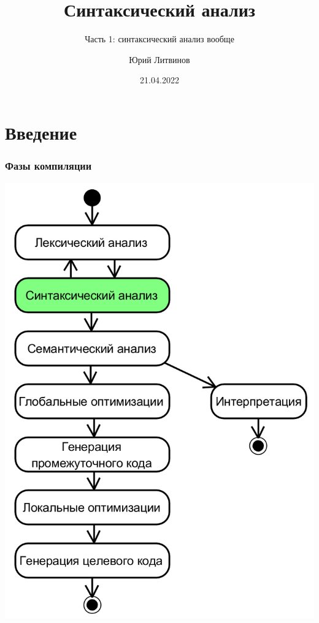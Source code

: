 \documentclass[xetex,mathserif,serif]{beamer}
\title{Синтаксический анализ}
\subtitle{Часть 1: синтаксический анализ вообще}
\author{Юрий Литвинов}
\date{21.04.2022}
\begin{document}
    
    \frame{\titlepage}

    \section{Введение}

    \begin{frame}
        \frametitle{Фазы компиляции}
        \begin{center}
            \includegraphics[height=0.8\textheight]{compilerPhases.png}
        \end{center}
    \end{frame}
\end{document}

